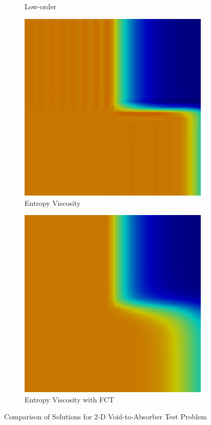 \begin{figure}[h]
\begin{subfigure}{0.3\textwidth}
      \caption{Low-order}
   \end{subfigure}
   \begin{subfigure}{0.3\textwidth}
      \includegraphics[width=\textwidth]{void_to_absorber/EV.png}
      \caption{Entropy Viscosity}
   \end{subfigure}
   \begin{subfigure}{0.3\textwidth}
      \includegraphics[width=\textwidth]{void_to_absorber/EVFCT.png}
      \caption{Entropy Viscosity with FCT}
   \end{subfigure}
   \caption{Comparison of Solutions for 2-D Void-to-Absorber Test Problem}
   \label{fig:void_to_absorber_2D}
\end{figure}
